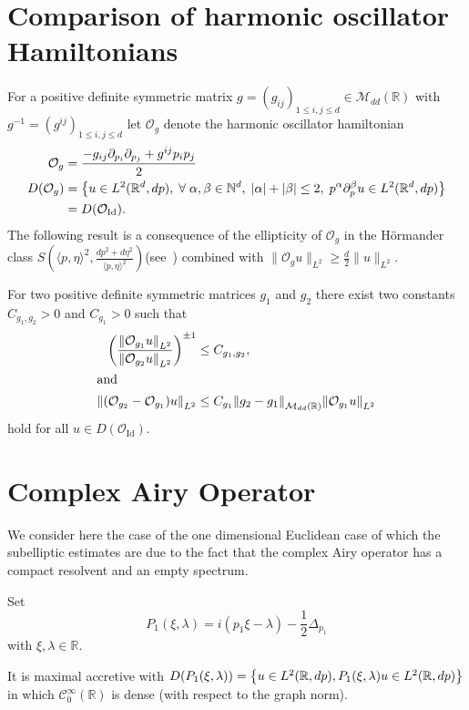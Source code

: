 \documentclass[AHL,Unicode,longabstracts]{cedram}
\newcommand{\R}{\mathbb{R}}
\newcommand{\N}{\mathbb{N}}
\newcommand{\clC}{\mathcal{C}}
\newcommand{\clO}{\mathcal{O}}
\newcommand{\clM}{\mathcal{M}}
\DeclareMathOperator{\Idd}{Id}
\newcommand\norm[1]{\left\lVert#1\right\rVert}
\let\oldforall\forall
\renewcommand*{\forall}{\mathrel{\oldforall}}
\let\originalleft\left
\let\originalright\right
\renewcommand{\left}{\mathopen{}\mathclose\bgroup\originalleft}
\renewcommand{\right}{\aftergroup\egroup\originalright}
\begin{document}
\appendix
\section{Comparison of harmonic oscillator Hamiltonians} For a positive definite symmetric matrix $g=(g_{ij})_{1\leq i,j\leq d}\in \clM_{dd}(\R)$ with $g^{-1}=(g^{ij})_{1\leq i,j\leq d}$ let $\clO_{g}$ denote the harmonic oscillator hamiltonian
\begin{align*}
\clO_{g}&=\frac{-g_{ij}\partial_{p_i}\partial_{p_j}+g^{ij}p_ip_j}{2}\\
D(\clO_{g})&=\left\{u\in L^2(\R^d,dp),\; \forall\alpha,\beta\in\N^d, \;|\alpha|+|\beta|\leq 2,\; p^{\alpha}\partial_{p}^{\beta}u\in L^2(\R^d,dp)\right\}\\
&=D(\clO_{\Idd}).
\end{align*}
The following result is a consequence of the ellipticity of $\clO_{g}$ in the H\"ormander class $S(\langle p,\eta\rangle^2,
\frac{dp^2+d\eta^2}{\langle p,\eta\rangle^2})$(see~\cite[Chapter~XVIII]{HormIII}) combined with $\|\clO_g u\|_{L^2}\geq \frac{d}{2}\|u\|_{L^2}$.

\begin{prop}\label{pr:composcharm}
For two positive definite symmetric matrices $g_1$ and $g_2$ there exist two constants $C_{g_1,g_2}>0$ and $C_{g_1}>0$ such that
\begin{align*}
 \left(\frac{\norm{\clO_{g_1}u}_{L^2}}{\norm{\clO_{g_2}u}_{L^2}}\right)^{\pm 1}&\leq C_{g_1,g_2},\\
\intertext{and}
\norm{(\clO_{g_2}-\clO_{g_1})u}_{L^2}
&\leq C_{g_1}\norm{g_2-g_1}_{\clM_{dd}(\R)}\norm{\clO_{g_1}u}_{L^2}
\end{align*}
hold for all $u\in D(\clO_{\Idd})$.
\end{prop}

\section{Complex Airy Operator}
\label{sec:euconedim}

We consider here the case of the one dimensional Euclidean case of which the subelliptic estimates are due to the fact that the complex Airy operator has a compact resolvent and an empty spectrum.

Set
\[
P_{1}(\xi,\lambda)=i(p_{1}\xi-\lambda)-\frac{1}{2}\Delta_{p_{1}}
\]
with $\xi,\lambda\in \R$.

It is maximal accretive with $D(P_{1}(\xi,\lambda))=\left\{u\in L^{2}(\R,dp), P_{1}(\xi,\lambda)u\in L^{2}(\R,dp)\right\}$ in which $\clC^{\infty}_{0}(\R)$ is dense (with respect to the graph norm).
\end{document}
